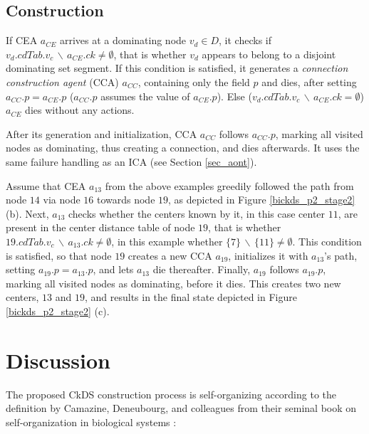\subsection{Construction}\label{p2con}

If CEA $a_{CE}$ arrives at a dominating node $v_d \in D$, it checks if $v_d.cdTab.v_c \,\backslash\, a_{CE}.ck \neq \emptyset$, that is whether $v_d$ appears to belong to a disjoint dominating set segment. If this condition is satisfied, it generates a \emph{connection construction agent} (CCA) $a_{CC}$, containing only the field $p$ and dies, after setting $a_{CC}.p=a_{CE}.p$ ($a_{CC}.p$ assumes the value of $a_{CE}.p$). Else ($v_d.cdTab.v_c \,\backslash\, a_{CE}.ck = \emptyset$) $a_{CE}$ dies without any actions.



After its generation and initialization, CCA $a_{CC}$ follows $a_{CC}.p$, marking all visited nodes as dominating, thus creating a connection, and dies afterwards. It uses the same failure handling as an ICA (see Section \ref{sec_aont}).

\exampleBegin 
Assume that CEA $a_{13}$ from the above examples greedily followed the path from node $14$ via node $16$ towards node $19$, as depicted in Figure \ref{bickds_p2_stage2} (b). Next, $a_{13}$ checks whether the centers known by it, in this case center $11$, are present in the center distance table of node $19$, that is whether $19.cdTab.v_c \,\backslash\, a_{13}.ck \neq \emptyset$, in this example whether $\{7\} \,\backslash\, \{11\}\neq \emptyset$. This condition is satisfied, so that node $19$ creates a new CCA $a_{19}$, initializes it with $a_{13}$'s path, setting $a_{19}.p=a_{13}.p$, and lets $a_{13}$ die thereafter. Finally, $a_{19}$ follows $a_{19}.p$, marking all visited nodes as dominating, before it dies. This creates two new centers, $13$ and $19$, and results in the final state depicted in Figure \ref{bickds_p2_stage2} (c).
\exampleEnd



\section{Discussion}\label{ourprotdisc}\label{sec_d2}


The proposed CkDS construction process is self-organizing according to the definition by Camazine, Deneubourg, and colleagues from their seminal book on self-organization in biological systems \cite{camazine03organization}:

